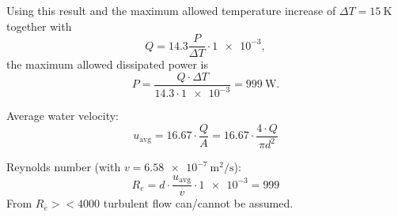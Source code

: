 \documentclass[10pt,a4paper,noendnumber=true]{scrartcl}
\begin{document}
Using this result and the maximum allowed temperature increase of $\Delta T=\SI{15}{\kelvin}$ together with
\begin{equation}
    Q = 14.3 \frac{P}{\Delta T} \cdot \num{1e-3},
\end{equation}
the maximum allowed dissipated power is
\begin{equation}
    P = \frac{Q \cdot \Delta T}{14.3 \cdot \num{1e-3}} = \SI{999}{\watt}.
\end{equation}

Average water velocity:
\begin{equation}
    u_\text{avg} = 16.67 \cdot \frac{Q}{A} = 16.67 \cdot \frac{4\cdot Q}{\pi d^2}
\end{equation}

Reynolds number (with $v=\SI{6.58e-7}{\meter\squared\per\second}$):
\begin{equation}
    R_e = d \cdot \frac{u_\text{avg}}{v} \cdot \num{1e-3} = \num{999}
\end{equation}
From $R_e><4000$ turbulent flow can/cannot be assumed.
\end{document}
